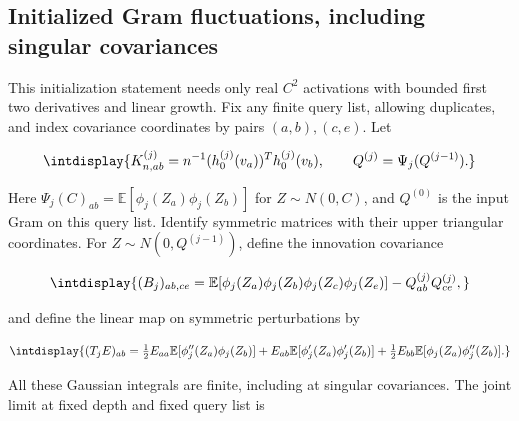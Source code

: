 \subsection{Initialized Gram fluctuations, including singular covariances}
\label{int:dense-initialized-gram-clt}


This initialization statement needs only real \(C^2\) activations with bounded first two derivatives and linear growth. Fix any finite query list, allowing duplicates, and index covariance coordinates by pairs \((a,\allowbreak b),\allowbreak (c,\allowbreak e)\). Let


\begingroup\renewcommand{\theHequation}{intdisplay.76}
\begin{equation*}
\intdisplay{
K_{n,ab}^{(j)}=n^{-1}(h_0^{(j)}(v_a))^Th_0^{(j)}(v_b),
\qquad Q^{(j)}=\Psi_j(Q^{(j-1)}).
}
\end{equation*}
\endgroup


Here \(\Psi_j(C)_{ab}=\mathbb E[\phi_j(Z_a)\phi_j(Z_b)]\) for \(Z\sim N(0,\allowbreak C)\), and \(Q^{(0)}\) is the input Gram on this query list. Identify symmetric matrices with their upper triangular coordinates. For \(Z\sim N(0,\allowbreak Q^{(j-1)})\), define the innovation covariance


\begingroup\renewcommand{\theHequation}{intdisplay.77}
\begin{equation*}
\intdisplay{
(B_j)_{ab,ce}=
\mathbb E[\phi_j(Z_a)\phi_j(Z_b)\phi_j(Z_c)\phi_j(Z_e)]
-Q^{(j)}_{ab}Q^{(j)}_{ce},
}
\end{equation*}
\endgroup


and define the linear map on symmetric perturbations by


\begingroup\renewcommand{\theHequation}{intdisplay.78}
\begin{equation*}
\intdisplay{
(T_jE)_{ab}=
\tfrac12E_{aa}\mathbb E[\phi_j''(Z_a)\phi_j(Z_b)]
+E_{ab}\mathbb E[\phi_j'(Z_a)\phi_j'(Z_b)]
+\tfrac12E_{bb}\mathbb E[\phi_j(Z_a)\phi_j''(Z_b)].
}
\end{equation*}
\endgroup


All these Gaussian integrals are finite, including at singular covariances. The joint limit at fixed depth and fixed query list is


